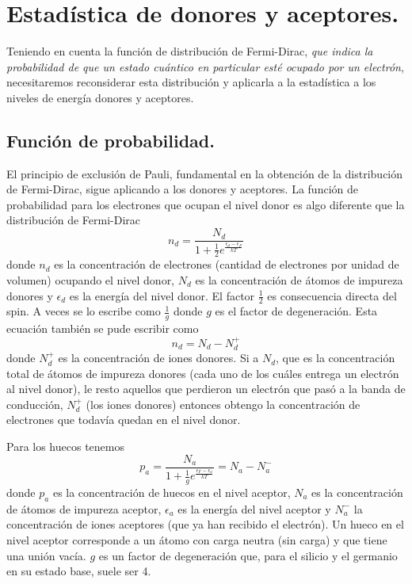 \documentclass[12pt,a4paper]{article}
\begin{document}
\section{Estadística de donores y aceptores.}

Teniendo en cuenta la función de distribución de Fermi-Dirac, \emph{que indica la probabilidad de que un estado cuántico en particular esté ocupado por un electrón}, necesitaremos reconsiderar esta distribución y aplicarla a la estadística a los niveles de energía donores y aceptores.

\subsection{Función de probabilidad.}

El principio de exclusión de Pauli, fundamental en la obtención de la distribución de Fermi-Dirac, sigue aplicando a los donores y aceptores. La función de probabilidad para los electrones que ocupan el nivel donor es algo diferente que la distribución de Fermi-Dirac
\[ n_{d}=\frac{N_{d}}{1+\frac{1}{2}e^{\frac{\epsilon _{d} - \epsilon _{F}}{kT}}} \]
donde $n_{d}$ es la concentración de electrones (cantidad de electrones por unidad de volumen) ocupando el nivel donor, $N_{d}$ es la concentración de átomos de impureza donores y $\epsilon _{d}$ es la energía del nivel donor. El factor $\frac{1}{2}$ es consecuencia directa del spin. A veces se lo escribe como $\frac{1}{g}$ donde $g$ es el factor de degeneración. Esta ecuación también se pude escribir como
\[ n_{d} = N_{d} - N_{d}^{+} \]
donde $N_{d}^{+}$ es la concentración de iones donores. Si a $N_{d}$, que es la concentración total de átomos de impureza donores (cada uno de los cuáles entrega un electrón al nivel donor), le resto aquellos que perdieron un electrón que pasó a la banda de conducción, $N_{d}^{+}$ (los iones donores) entonces obtengo la concentración de electrones que todavía quedan en el nivel donor.

Para los huecos tenemos
\[ p_{a} = \frac{N_{a}}{1+\frac{1}{g}e^{\frac{\epsilon _{F} - \epsilon _{a}}{kT}}} = N_{a} - N_{a}^{-} \]
donde $p_{a}$ es la concentración de huecos en el nivel aceptor, $N_{a}$ es la concentración de átomos de impureza aceptor, $\epsilon _{a}$ es la energía del nivel aceptor y $N_{a}^{-}$ la concentración de iones aceptores (que ya han recibido el electrón). Un hueco en el nivel aceptor corresponde a un átomo con carga neutra (sin carga) y que tiene una unión vacía. $g$ es un factor de degeneración que, para el silicio y el germanio en su estado base, suele ser 4.
\end{document}
